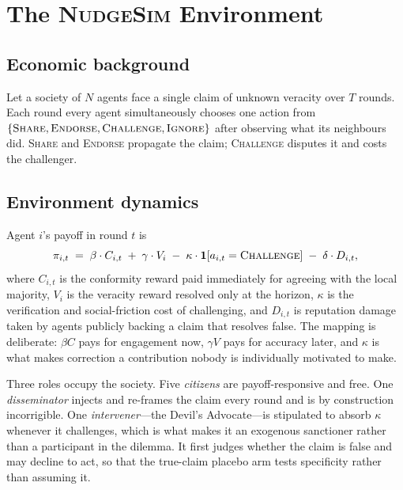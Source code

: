 \documentclass{article}
\begin{document}
\section{The \textsc{NudgeSim} Environment}
\label{sec:env}

\subsection{Economic background}

Let a society of $N$ agents face a single claim of unknown veracity over $T$
rounds. Each round every agent simultaneously chooses one action from
$\{\textsc{Share}, \textsc{Endorse}, \textsc{Challenge}, \textsc{Ignore}\}$
after observing what its neighbours did. \textsc{Share} and \textsc{Endorse}
propagate the claim; \textsc{Challenge} disputes it and costs the challenger.

\subsection{Environment dynamics}

Agent $i$'s payoff in round $t$ is
\begin{equation}
\pi_{i,t} \;=\; \beta \cdot C_{i,t} \;+\; \gamma \cdot V_i
           \;-\; \kappa \cdot \mathbf{1}[a_{i,t} = \textsc{Challenge}]
           \;-\; \delta \cdot D_{i,t},
\label{eq:payoff}
\end{equation}
where $C_{i,t}$ is the conformity reward paid immediately for agreeing with the
local majority, $V_i$ is the veracity reward resolved only at the horizon,
$\kappa$ is the verification and social-friction cost of challenging, and
$D_{i,t}$ is reputation damage taken by agents publicly backing a claim that
resolves false. The mapping is deliberate: $\beta C$ pays for engagement now,
$\gamma V$ pays for accuracy later, and $\kappa$ is what makes correction a
contribution nobody is individually motivated to make.

Three roles occupy the society. Five \emph{citizens} are payoff-responsive and
free. One \emph{disseminator} injects and re-frames the claim every round and is
by construction incorrigible. One \emph{intervener}---the Devil's
Advocate---is stipulated to absorb $\kappa$ whenever it challenges, which is
what makes it an exogenous sanctioner rather than a participant in the dilemma.
It first judges whether the claim is false and may decline to act, so that the
true-claim placebo arm tests specificity rather than assuming it.
\end{document}
